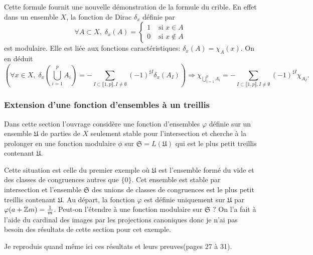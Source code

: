 \begin{rem}
  Cette formule fournit une nouvelle démonstration de la formule du crible. En effet dans un ensemble $X$, la fonction de Dirac $\delta_x$ définie par 
  \begin{displaymath}
     \forall A \subset X, \;\delta_x(A) = 
    \left\lbrace
    \begin{aligned}
      1 &\text{ si } x \in A \\
      0 &\text{ si } x \notin A
    \end{aligned}
    \right.
  \end{displaymath}
  est modulaire. Elle est liée aux fonctions caractéristiques: $\delta_x(A) = \chi_A(x)$. On en déduit 
  \begin{displaymath}
    \left( \forall x \in X, \; \delta_x(\bigcup_{i=1}^p A_i) = - \sum_{I \subset \llbracket 1,p \rrbracket, I\neq \emptyset} (-1)^{\sharp I}\delta_x(A_I) \right)
    \Rightarrow  \chi_{\bigcup_{i=1}^p A_i} = - \sum_{I \subset \llbracket 1,p \rrbracket, I\neq \emptyset} (-1)^{\sharp I}\chi_{A_I}.
  \end{displaymath}
\end{rem}


\subsubsection{Extension d'une fonction d'ensembles à un treillis}
Dans cette section l'ouvrage considère une fonction d'ensembles $\varphi$ définie sur un ensemble $\mathfrak{U}$ de parties de $X$ seulement stable pour l'intersection et cherche à la prolonger en une fonction modulaire $\phi$ sur $\mathfrak{S} = L(\mathfrak{U})$ qui est le plus petit treillis contenant $\mathfrak{U}$. 

Cette situation est celle du premier exemple où $\mathfrak{U}$ est l'ensemble formé du vide et des classes de congruences autres que $\{0\}$. Cet ensemble est stable par intersection et l'ensemble $\mathfrak{S}$ des unions de classes de congruences est le plus petit treillis contenant $\mathfrak{U}$. 
Au départ, la fonction $\varphi$ est définie uniquement sur $\mathfrak{U}$ par  $\varphi(a + \mathbb{Z} m) = \frac{1}{m}$. 
Peut-on l'étendre à une fonction modulaire sur $\mathfrak{S}$ ? On l'a fait à l'aide du cardinal des images par les projections canoniques donc je n'ai pas besoin des résultats de cette section pour cet exemple.

Je reproduis quand même ici ces résultats et leurs preuves(pages 27 à 31).


